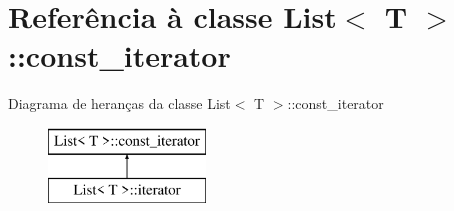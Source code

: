 \hypertarget{class_list_1_1const__iterator}{}\section{Referência à classe List$<$ T $>$\+:\+:const\+\_\+iterator}
\label{class_list_1_1const__iterator}
Diagrama de heranças da classe List$<$ T $>$\+:\+:const\+\_\+iterator\begin{figure}[H]
\begin{center}
\leavevmode
\includegraphics[height=2.000000cm]{class_list_1_1const__iterator}
\end{center}
\end{figure}
